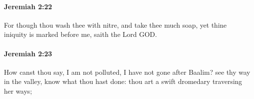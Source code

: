 		\paragraph{Jeremiah 2:22} %
			\label{JEREMIAH-2-22}

			For though thou wash thee with nitre, and take thee much soap, yet thine iniquity is marked before me, saith the Lord GOD.


		\paragraph{Jeremiah 2:23} %
			\label{JEREMIAH-2-23}

			How canst thou say, I am not polluted, I have not gone after Baalim? see thy way in the valley, know what thou hast done: thou art a swift dromedary traversing her ways;


